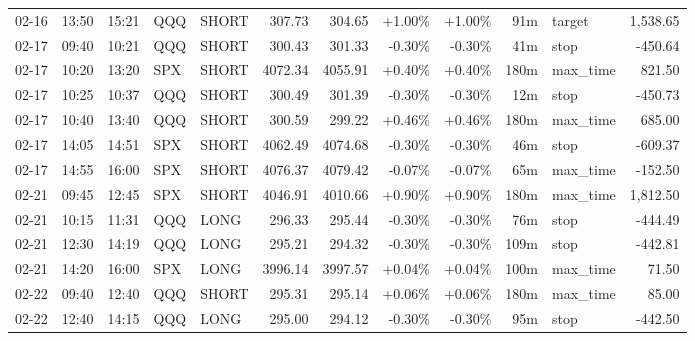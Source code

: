 \documentclass[11pt,a4paper,twoside]{article}
\begin{document}
\begin{center}
\begin{longtable}{>{\color{txtmain}}l l l l l r r r r r >{\color{txtmain}}l r}
02-16 & 13:50 & 15:21 & QQQ & SHORT & 307.73 & 304.65 & \textcolor{wingreen}{+1.00\%} & \textcolor{wingreen}{+1.00\%} & 91m & target & \textcolor{wingreen}{1,538.65} \\
02-17 & 09:40 & 10:21 & QQQ & SHORT & 300.43 & 301.33 & \textcolor{lossred}{-0.30\%} & \textcolor{lossred}{-0.30\%} & 41m & stop & \textcolor{lossred}{-450.64} \\
02-17 & 10:20 & 13:20 & SPX & SHORT & 4072.34 & 4055.91 & \textcolor{wingreen}{+0.40\%} & \textcolor{wingreen}{+0.40\%} & 180m & max\_time & \textcolor{wingreen}{821.50} \\
02-17 & 10:25 & 10:37 & QQQ & SHORT & 300.49 & 301.39 & \textcolor{lossred}{-0.30\%} & \textcolor{lossred}{-0.30\%} & 12m & stop & \textcolor{lossred}{-450.73} \\
02-17 & 10:40 & 13:40 & QQQ & SHORT & 300.59 & 299.22 & \textcolor{wingreen}{+0.46\%} & \textcolor{wingreen}{+0.46\%} & 180m & max\_time & \textcolor{wingreen}{685.00} \\
02-17 & 14:05 & 14:51 & SPX & SHORT & 4062.49 & 4074.68 & \textcolor{lossred}{-0.30\%} & \textcolor{lossred}{-0.30\%} & 46m & stop & \textcolor{lossred}{-609.37} \\
02-17 & 14:55 & 16:00 & SPX & SHORT & 4076.37 & 4079.42 & \textcolor{lossred}{-0.07\%} & \textcolor{lossred}{-0.07\%} & 65m & max\_time & \textcolor{lossred}{-152.50} \\
02-21 & 09:45 & 12:45 & SPX & SHORT & 4046.91 & 4010.66 & \textcolor{wingreen}{+0.90\%} & \textcolor{wingreen}{+0.90\%} & 180m & max\_time & \textcolor{wingreen}{1,812.50} \\
02-21 & 10:15 & 11:31 & QQQ & LONG & 296.33 & 295.44 & \textcolor{lossred}{-0.30\%} & \textcolor{lossred}{-0.30\%} & 76m & stop & \textcolor{lossred}{-444.49} \\
02-21 & 12:30 & 14:19 & QQQ & LONG & 295.21 & 294.32 & \textcolor{lossred}{-0.30\%} & \textcolor{lossred}{-0.30\%} & 109m & stop & \textcolor{lossred}{-442.81} \\
02-21 & 14:20 & 16:00 & SPX & LONG & 3996.14 & 3997.57 & \textcolor{wingreen}{+0.04\%} & \textcolor{wingreen}{+0.04\%} & 100m & max\_time & \textcolor{wingreen}{71.50} \\
02-22 & 09:40 & 12:40 & QQQ & SHORT & 295.31 & 295.14 & \textcolor{wingreen}{+0.06\%} & \textcolor{wingreen}{+0.06\%} & 180m & max\_time & \textcolor{wingreen}{85.00} \\
02-22 & 12:40 & 14:15 & QQQ & LONG & 295.00 & 294.12 & \textcolor{lossred}{-0.30\%} & \textcolor{lossred}{-0.30\%} & 95m & stop & \textcolor{lossred}{-442.50} \\

\end{longtable}
\end{center}
\end{document}
